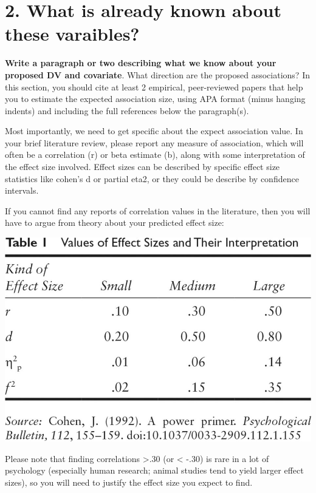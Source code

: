\documentclass[
]{book}
\begin{document}
\section*{2. What is already known about these varaibles?}\label{what-is-already-known-about-these-varaibles}

\textbf{Write a paragraph or two describing what we know about your proposed DV and covariate}. What direction are the proposed associations? In this section, you should cite at least 2 empirical, peer-reviewed papers that help you to estimate the expected association size, using APA format (minus hanging indents) and including the full references below the paragraph(s).

Most importantly, we need to get specific about the expect association value. In your brief literature review, please report any measure of association, which will often be a correlation (r) or beta estimate (b), along with some interpretation of the effect size involved. Effect sizes can be described by specific effect size statistics like cohen's d or partial eta2, or they could be describe by confidence intervals.

If you cannot find any reports of correlation values in the literature, then you will have to argue from theory about your predicted effect size:

\includegraphics{Figs/effect_size.jpg}

Please note that finding correlations \textgreater.30 (or \textless{} -.30) is rare in a lot of psychology (especially human research; animal studies tend to yield larger effect sizes), so you will need to justify the effect size you expect to find.
\end{document}
